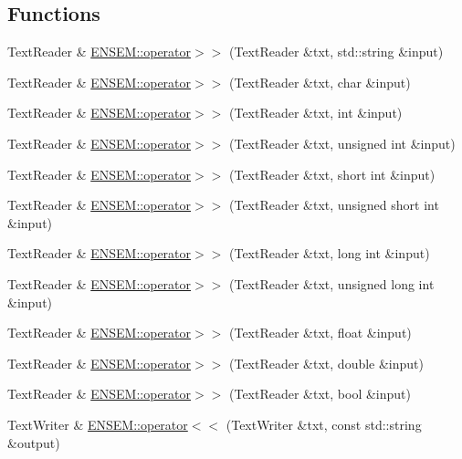 \subsection*{Functions}
\begin{DoxyCompactItemize}
\item 
Text\+Reader \& \mbox{\hyperlink{group__io_ga03bd5b812dccb5e134a27e34c6e375bb}{E\+N\+S\+E\+M\+::operator$>$$>$}} (Text\+Reader \&txt, std\+::string \&input)
\item 
Text\+Reader \& \mbox{\hyperlink{group__io_ga4eecbfcd47e20672ad52ed41560f8573}{E\+N\+S\+E\+M\+::operator$>$$>$}} (Text\+Reader \&txt, char \&input)
\item 
Text\+Reader \& \mbox{\hyperlink{group__io_gab07a2169d63109c0bd1ec46e750bed16}{E\+N\+S\+E\+M\+::operator$>$$>$}} (Text\+Reader \&txt, int \&input)
\item 
Text\+Reader \& \mbox{\hyperlink{group__io_gac2f3c9587dbdd787bd2dfe5023813c67}{E\+N\+S\+E\+M\+::operator$>$$>$}} (Text\+Reader \&txt, unsigned int \&input)
\item 
Text\+Reader \& \mbox{\hyperlink{group__io_gad9337602901bc89db928ac4dc262e96f}{E\+N\+S\+E\+M\+::operator$>$$>$}} (Text\+Reader \&txt, short int \&input)
\item 
Text\+Reader \& \mbox{\hyperlink{group__io_ga371e4c7d2636c108da9fd5217e1532ce}{E\+N\+S\+E\+M\+::operator$>$$>$}} (Text\+Reader \&txt, unsigned short int \&input)
\item 
Text\+Reader \& \mbox{\hyperlink{group__io_ga7f8e9c81ef087d66a47d71decfc6456f}{E\+N\+S\+E\+M\+::operator$>$$>$}} (Text\+Reader \&txt, long int \&input)
\item 
Text\+Reader \& \mbox{\hyperlink{group__io_gadafd202db51d66c8ce03edc7a6cd1e0f}{E\+N\+S\+E\+M\+::operator$>$$>$}} (Text\+Reader \&txt, unsigned long int \&input)
\item 
Text\+Reader \& \mbox{\hyperlink{group__io_gadcd1421418b0255e88751789c70e23e4}{E\+N\+S\+E\+M\+::operator$>$$>$}} (Text\+Reader \&txt, float \&input)
\item 
Text\+Reader \& \mbox{\hyperlink{group__io_gaae0d5e305c1af4b3085b3a4f3b15f4e9}{E\+N\+S\+E\+M\+::operator$>$$>$}} (Text\+Reader \&txt, double \&input)
\item 
Text\+Reader \& \mbox{\hyperlink{group__io_ga807a1dae246fb10630e4e967d01b2e85}{E\+N\+S\+E\+M\+::operator$>$$>$}} (Text\+Reader \&txt, bool \&input)
\item 
Text\+Writer \& \mbox{\hyperlink{group__io_ga30a170c6f2ec820ececb3d3525e2ffa6}{E\+N\+S\+E\+M\+::operator$<$$<$}} (Text\+Writer \&txt, const std\+::string \&output)

\end{DoxyCompactItemize}
